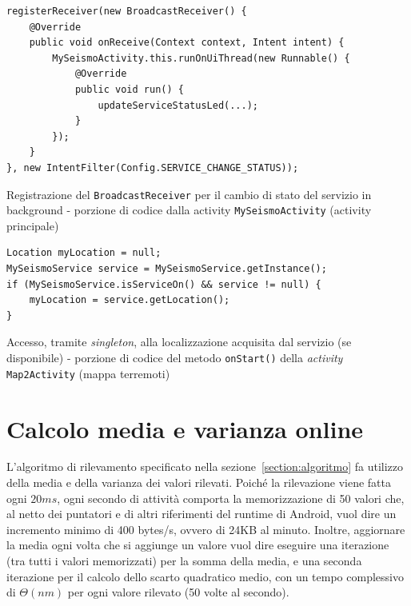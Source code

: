 \documentclass[a4paper,10pt]{memoir}
\begin{document}
\begin{listing}[h]
\begin{verbatim}
registerReceiver(new BroadcastReceiver() {
	@Override
	public void onReceive(Context context, Intent intent) {
		MySeismoActivity.this.runOnUiThread(new Runnable() {
			@Override
			public void run() {
				updateServiceStatusLed(...);
			}
		});
	}
}, new IntentFilter(Config.SERVICE_CHANGE_STATUS));
\end{verbatim}
\caption{Registrazione del \texttt{BroadcastReceiver} per il cambio di stato del servizio in background - porzione di codice dalla activity \texttt{MySeismoActivity} (activity principale)}
\end{listing}


\begin{listing}[h]
\begin{verbatim}
Location myLocation = null;
MySeismoService service = MySeismoService.getInstance();
if (MySeismoService.isServiceOn() && service != null) {
	myLocation = service.getLocation();
}
\end{verbatim}
\caption{Accesso, tramite \textit{singleton}, alla localizzazione acquisita dal servizio (se disponibile) - porzione di codice del metodo \texttt{onStart()} della \textit{activity} \texttt{Map2Activity} (mappa terremoti)}
\end{listing}

\section{Calcolo media e varianza online}
\label{section:onlinealg}

L'algoritmo di rilevamento specificato nella sezione~\ref{section:algoritmo} fa utilizzo della media e della varianza dei valori rilevati. Poiché la rilevazione viene fatta ogni $20ms$, ogni secondo di attività comporta la memorizzazione di 50 valori che, al netto dei puntatori e di altri riferimenti del runtime di Android, vuol dire un incremento minimo di 400 bytes/s, ovvero di 24KB al minuto. Inoltre, aggiornare la media ogni volta che si aggiunge un valore vuol dire eseguire una iterazione (tra tutti i valori memorizzati) per la somma della media, e una seconda iterazione per il calcolo dello scarto quadratico medio, con un tempo complessivo di $\Theta(nm)$ per ogni valore rilevato (50 volte al secondo).
\end{document}
